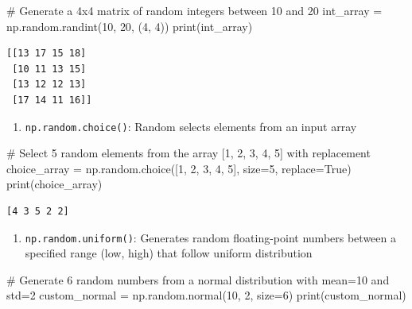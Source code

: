 \documentclass[
  letterpaper,
  DIV=11,
  numbers=noendperiod]{scrreprt}
\newenvironment{Shaded}{\begin{snugshade}}{\end{snugshade}}
\newcommand{\BuiltInTok}[1]{\textcolor[rgb]{0.00,0.23,0.31}{#1}}
\newcommand{\CommentTok}[1]{\textcolor[rgb]{0.37,0.37,0.37}{#1}}
\newcommand{\DecValTok}[1]{\textcolor[rgb]{0.68,0.00,0.00}{#1}}
\newcommand{\NormalTok}[1]{\textcolor[rgb]{0.00,0.23,0.31}{#1}}
\newcommand{\OperatorTok}[1]{\textcolor[rgb]{0.37,0.37,0.37}{#1}}
\newcommand{\VariableTok}[1]{\textcolor[rgb]{0.07,0.07,0.07}{#1}}
\providecommand{\tightlist}{%
  \setlength{\itemsep}{0pt}\setlength{\parskip}{0pt}}\usepackage{longtable,booktabs,array}
\begin{document}
\begin{Shaded}
\begin{Highlighting}[]
\CommentTok{\# Generate a 4x4 matrix of random integers between 10 and 20}
\NormalTok{int\_array }\OperatorTok{=}\NormalTok{ np.random.randint(}\DecValTok{10}\NormalTok{, }\DecValTok{20}\NormalTok{, (}\DecValTok{4}\NormalTok{, }\DecValTok{4}\NormalTok{))}
\BuiltInTok{print}\NormalTok{(int\_array)}
\end{Highlighting}
\end{Shaded}

\begin{verbatim}
[[13 17 15 18]
 [10 11 13 15]
 [13 12 12 13]
 [17 14 11 16]]
\end{verbatim}

\begin{enumerate}
\def\labelenumi{\arabic{enumi}.}
\setcounter{enumi}{3}
\tightlist
\item
  \texttt{np.random.choice()}: Random selects elements from an input
  array
\end{enumerate}

\begin{Shaded}
\begin{Highlighting}[]
\CommentTok{\# Select 5 random elements from the array [1, 2, 3, 4, 5] with replacement}
\NormalTok{choice\_array }\OperatorTok{=}\NormalTok{ np.random.choice([}\DecValTok{1}\NormalTok{, }\DecValTok{2}\NormalTok{, }\DecValTok{3}\NormalTok{, }\DecValTok{4}\NormalTok{, }\DecValTok{5}\NormalTok{], size}\OperatorTok{=}\DecValTok{5}\NormalTok{, replace}\OperatorTok{=}\VariableTok{True}\NormalTok{)}
\BuiltInTok{print}\NormalTok{(choice\_array)}
\end{Highlighting}
\end{Shaded}

\begin{verbatim}
[4 3 5 2 2]
\end{verbatim}

\begin{enumerate}
\def\labelenumi{\arabic{enumi}.}
\setcounter{enumi}{4}
\tightlist
\item
  \texttt{np.random.uniform()}: Generates random floating-point numbers
  between a specified range (low, high) that follow uniform distribution
\end{enumerate}

\begin{Shaded}
\begin{Highlighting}[]
\CommentTok{\# Generate 6 random numbers from a normal distribution with mean=10 and std=2}
\NormalTok{custom\_normal }\OperatorTok{=}\NormalTok{ np.random.normal(}\DecValTok{10}\NormalTok{, }\DecValTok{2}\NormalTok{, size}\OperatorTok{=}\DecValTok{6}\NormalTok{)}
\BuiltInTok{print}\NormalTok{(custom\_normal)}
\end{Highlighting}
\end{Shaded}
\end{document}
